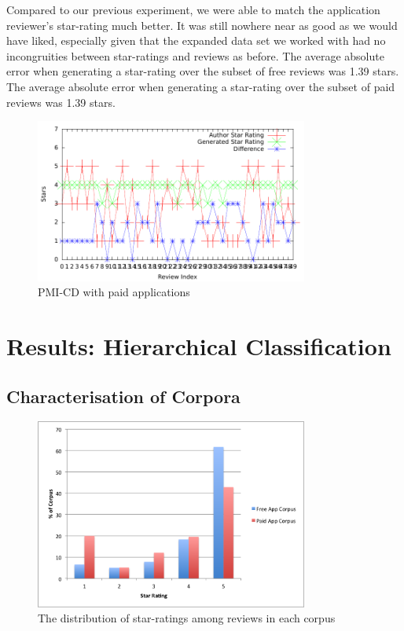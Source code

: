 \documentclass[11pt]{report} %
\begin{document}
Compared to our previous experiment, we were able to match the application reviewer's star-rating much better. It was still nowhere near as good as we would have liked, especially given that the expanded data set we worked with had no incongruities between star-ratings and reviews as before. The average absolute error when generating a star-rating over the subset of free reviews was 1.39 stars. The average absolute error when generating a star-rating over the subset of paid reviews was 1.39 stars.
	
	\begin{figure}[H]
	\centering
	\includegraphics[width=0.8\textwidth]{data/pmi-cd-paid.pdf}
	\caption{PMI-CD with paid applications}
	\label{fig:pmi-cd-paid}
	\end{figure}

	\section{Results: Hierarchical Classification}

	\subsection{Characterisation of Corpora} 

	\begin{figure}[H]
	\centering
	\includegraphics[width=0.8\textwidth]{data/dist_corpora.png}
	\caption{The distribution of star-ratings among reviews in each corpus}
	\label{fig:pmi-hc-corp-dist}
	\end{figure}
\end{document}
